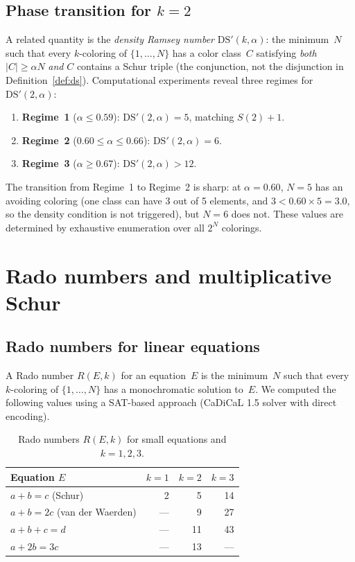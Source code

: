 \documentclass[11pt]{article}
\theoremstyle{plain}
\theoremstyle{definition}
\newcommand{\DS}{\mathrm{DS}}
\begin{document}
\subsection{Phase transition for $k=2$}

A related quantity is the \emph{density Ramsey number}
$\DS'(k,\alpha)$: the minimum~$N$ such that every $k$-coloring of
$\{1,\ldots,N\}$ has a color class~$C$ satisfying \emph{both}
$|C|\ge\alpha N$ \emph{and} $C$ contains a Schur triple (the
conjunction, not the disjunction in Definition~\ref{def:ds}).
Computational experiments reveal three regimes for
$\DS'(2,\alpha)$:

\begin{enumerate}[nosep]
\item \textbf{Regime~1} ($\alpha \le 0.59$): $\DS'(2,\alpha) = 5$,
matching $S(2)+1$.
\item \textbf{Regime~2} ($0.60 \le \alpha \le 0.66$):
$\DS'(2,\alpha) = 6$.
\item \textbf{Regime~3} ($\alpha \ge 0.67$): $\DS'(2,\alpha) > 12$.
\end{enumerate}

\noindent
The transition from Regime~1 to Regime~2 is sharp: at $\alpha=0.60$,
$N=5$ has an avoiding coloring (one class can have 3 out of 5
elements, and $3 < 0.60 \times 5 = 3.0$, so the density condition
is not triggered), but $N=6$ does not.
These values are determined by exhaustive enumeration over all
$2^N$ colorings.

\section{Rado numbers and multiplicative Schur}\label{sec:rado}

\subsection{Rado numbers for linear equations}

A Rado number $R(E,k)$ for an equation~$E$ is the minimum~$N$ such
that every $k$-coloring of $\{1,\ldots,N\}$ has a monochromatic
solution to~$E$.
We computed the following values using a SAT-based approach
(CaDiCaL 1.5 solver with direct encoding).

\begin{table}[ht]
\centering
\caption{Rado numbers $R(E,k)$ for small equations and
$k=1,2,3$.}\label{tab:rado}
\smallskip
\begin{tabular}{@{}l rrr@{}}
\toprule
Equation $E$ & $k=1$ & $k=2$ & $k=3$ \\
\midrule
$a+b=c$ (Schur)       &  2 &  5 & 14 \\
$a+b=2c$ (van der Waerden) &  --- &  9 & 27 \\
$a+b+c=d$             &  --- & 11 & 43 \\
$a+2b=3c$             &  --- & 13 & --- \\
\bottomrule
\end{tabular}
\end{table}
\end{document}
